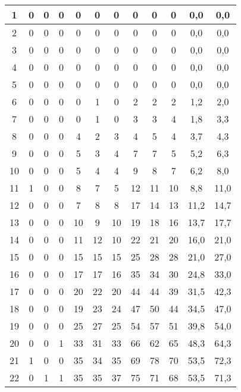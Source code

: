 \begin{center}
\begin{longtable}{|c|c|c|c|c|c|c|c|c|c|c|c|}
		1  & 0 & 0 & 0 & 0  & 0  & 0  & 0   & 0   & 0   & 0,0      & 0,0    \\ \hline
		2  & 0 & 0 & 0 & 0  & 0  & 0  & 0   & 0   & 0   & 0,0      & 0,0    \\ \hline
		3  & 0 & 0 & 0 & 0  & 0  & 0  & 0   & 0   & 0   & 0,0      & 0,0    \\ \hline
		4  & 0 & 0 & 0 & 0  & 0  & 0  & 0   & 0   & 0   & 0,0      & 0,0    \\ \hline
		5  & 0 & 0 & 0 & 0  & 0  & 0  & 0   & 0   & 0   & 0,0      & 0,0    \\ \hline
		6  & 0 & 0 & 0 & 0  & 1  & 0  & 2   & 2   & 2   & 1,2      & 2,0    \\ \hline
		7  & 0 & 0 & 0 & 0  & 1  & 0  & 3   & 3   & 4   & 1,8      & 3,3    \\ \hline
		8  & 0 & 0 & 0 & 4  & 2  & 3  & 4   & 5   & 4   & 3,7      & 4,3    \\ \hline
		9  & 0 & 0 & 0 & 5  & 3  & 4  & 7   & 7   & 5   & 5,2      & 6,3    \\ \hline
		10 & 0 & 0 & 0 & 5  & 4  & 4  & 9   & 8   & 7   & 6,2      & 8,0    \\ \hline
		11 & 1 & 0 & 0 & 8  & 7  & 5  & 12  & 11  & 10  & 8,8      & 11,0   \\ \hline
		12 & 0 & 0 & 0 & 7  & 8  & 8  & 17  & 14  & 13  & 11,2     & 14,7   \\ \hline
		13 & 0 & 0 & 0 & 10 & 9  & 10 & 19  & 18  & 16  & 13,7     & 17,7   \\ \hline
		14 & 0 & 0 & 0 & 11 & 12 & 10 & 22  & 21  & 20  & 16,0     & 21,0   \\ \hline
		15 & 0 & 0 & 0 & 15 & 15 & 15 & 25  & 28  & 28  & 21,0     & 27,0   \\ \hline
		16 & 0 & 0 & 0 & 17 & 17 & 16 & 35  & 34  & 30  & 24,8     & 33,0   \\ \hline
		17 & 0 & 0 & 0 & 20 & 22 & 20 & 44  & 44  & 39  & 31,5     & 42,3   \\ \hline
		18 & 0 & 0 & 0 & 19 & 23 & 24 & 47  & 50  & 44  & 34,5     & 47,0   \\ \hline
		19 & 0 & 0 & 0 & 25 & 27 & 25 & 54  & 57  & 51  & 39,8     & 54,0   \\ \hline
		20 & 0 & 0 & 1 & 33 & 31 & 33 & 66  & 62  & 65  & 48,3     & 64,3   \\ \hline
		21 & 1 & 0 & 0 & 35 & 34 & 35 & 69  & 78  & 70  & 53,5     & 72,3   \\ \hline
		22 & 0 & 1 & 1 & 35 & 35 & 37 & 75  & 71  & 68  & 53,5     & 71,3   \\ \hline

\end{longtable}
\end{center}
